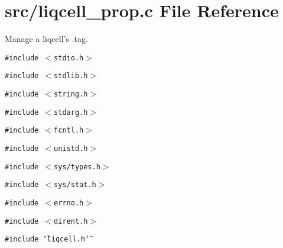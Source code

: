 \section{src/liqcell\_\-prop.c File Reference}
\label{d7/db4/liqcell__prop_8c}
Manage a liqcell's .tag.  


{\tt \#include $<$stdio.h$>$}\par
{\tt \#include $<$stdlib.h$>$}\par
{\tt \#include $<$string.h$>$}\par
{\tt \#include $<$stdarg.h$>$}\par
{\tt \#include $<$fcntl.h$>$}\par
{\tt \#include $<$unistd.h$>$}\par
{\tt \#include $<$sys/types.h$>$}\par
{\tt \#include $<$sys/stat.h$>$}\par
{\tt \#include $<$errno.h$>$}\par
{\tt \#include $<$dirent.h$>$}\par
{\tt \#include \char`\"{}liqcell.h\char`\"{}}\par
